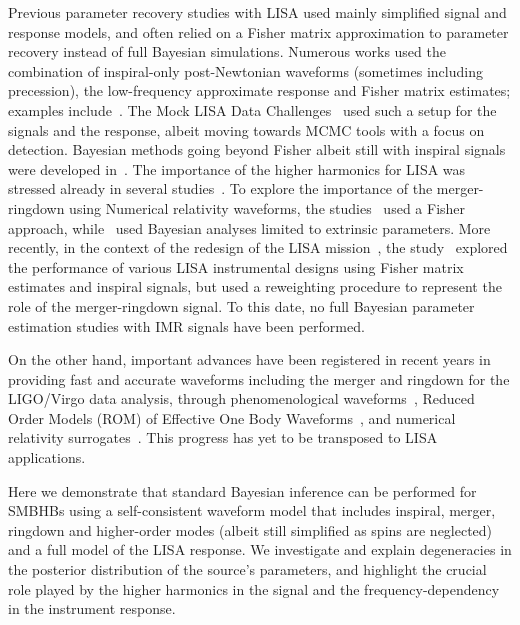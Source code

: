 \documentclass[aps,showpacs,twocolumn,prd,superscriptaddress,nofootinbib]{revtex4-1}
\begin{document}
Previous parameter recovery studies with LISA used mainly simplified signal and response models, and often relied on a Fisher matrix approximation to parameter recovery instead of full Bayesian simulations. Numerous works used the combination of inspiral-only post-Newtonian waveforms (sometimes including precession), the low-frequency approximate response and Fisher matrix estimates; examples include~\cite{Cutler97, Vecchio03, Arun06, Berti+04, LangHughes06}. The Mock LISA Data Challenges~\cite{MLDC09} used such a setup for the signals and the response, albeit moving towards MCMC tools with a focus on detection. Bayesian methods going beyond Fisher albeit still with inspiral signals were developed in~\cite{Brown+07, CornishPorter06a, Crowder+06, Wickham+06, Roever+07, Feroz+09, GairPorter09, Petiteau+09, PorterCarre13, PorterCornish15}. The importance of the higher harmonics for LISA was stressed already in several studies~\cite{Arun+07a, TriasSintes07, PorterCornish08, McWilliams+09}. To explore the importance of the merger-ringdown using Numerical relativity waveforms, the studies~\cite{Thorpe+08, McWilliams+09, McWilliams+10, McWilliams+11} used a Fisher approach, while~\cite{Babak+08} used Bayesian analyses limited to extrinsic parameters. More recently, in the context of the redesign of the LISA mission~\cite{elisa13}, the study~\cite{Klein+15} explored the performance of various LISA instrumental designs using Fisher matrix estimates and inspiral signals, but used a reweighting procedure to represent the role of the merger-ringdown signal. To this date, no full Bayesian parameter estimation studies with IMR signals have been performed.

On the other hand, important advances have been registered in recent years in providing fast and accurate waveforms including the merger and ringdown for the LIGO/Virgo data analysis, through phenomenological waveforms~\cite{Khan+15, London+17}, Reduced Order Models (ROM) of Effective One Body Waveforms~\cite{Puerrer14, Bohe+16}, and numerical relativity surrogates~\cite{Blackman+17b, Varma+18}. This progress has yet to be transposed to LISA applications.

Here we demonstrate that standard Bayesian inference can be performed for SMBHBs using a self-consistent waveform model that includes inspiral, merger, ringdown and higher-order modes (albeit still simplified as spins are neglected) and a full model of the LISA response. We investigate and explain degeneracies in the posterior distribution of the source's parameters, and highlight the crucial role played by the higher harmonics in the signal and the frequency-dependency in the instrument response.
\end{document}

